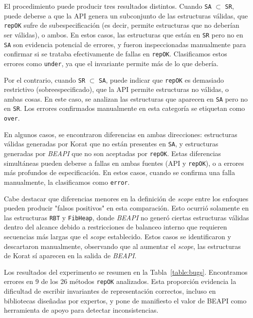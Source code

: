 El procedimiento puede producir tres resultados distintos. Cuando \texttt{SA} $\subset$ \texttt{SR}, 
puede deberse a que la API genera un subconjunto de las estructuras válidas, que \texttt{repOK} 
sufre de subespecificación (es decir, permite estructuras que no deberían ser válidas), o ambos. 
En estos casos, las estructuras que están en \texttt{SR} pero no en \texttt{SA} son evidencia potencial 
de errores, y fueron inspeccionadas manualmente para confirmar si se trataba efectivamente de fallas 
en \texttt{repOK}. Clasificamos estos errores como \texttt{under}, ya que el invariante permite más 
de lo que debería.

Por el contrario, cuando \texttt{SR} $\subset$ \texttt{SA}, puede indicar que \texttt{repOK} es demasiado 
restrictivo (sobreespecificado), que la API permite estructuras no válidas, o ambas cosas. En este 
caso, se analizan las estructuras que aparecen en \texttt{SA} pero no en \texttt{SR}. Los errores 
confirmados manualmente en esta categoría se etiquetan como \texttt{over}.

En algunos casos, se encontraron diferencias en ambas direcciones: estructuras válidas generadas por 
\textsf{Korat} que no están presentes en \texttt{SA}, y estructuras generadas por \emph{BEAPI} que 
no son aceptadas por \texttt{repOK}. Estas diferencias simultáneas pueden deberse a fallas en ambas 
fuentes (API y \texttt{repOK}), o a errores más profundos de especificación. En estos casos, cuando se 
confirma una falla manualmente, la clasificamos como \texttt{error}.

Cabe destacar que diferencias menores en la definición de \emph{scope} entre los enfoques pueden 
producir "falsos positivos" en esta comparación. Esto ocurrió solamente en las estructuras 
\texttt{RBT} y \texttt{FibHeap}, donde \emph{BEAPI} no generó ciertas estructuras válidas dentro del 
alcance debido a restricciones de balanceo interno que requieren secuencias más largas que el 
\emph{scope} establecido. Estos casos se identificaron y descartaron manualmente, observando que al 
aumentar el \emph{scope}, las estructuras de \textsf{Korat} sí aparecen en la salida de \emph{BEAPI}.

Los resultados del experimento se resumen en la Tabla~\ref{table:bugs}. Encontramos errores en 9 de 
los 26 métodos \texttt{repOK} analizados. Esta proporción evidencia la dificultad de escribir 
invariantes de representación correctos, incluso en bibliotecas diseñadas por expertos, y pone de 
manifiesto el valor de \textsf{BEAPI} como herramienta de apoyo para detectar inconsistencias.

